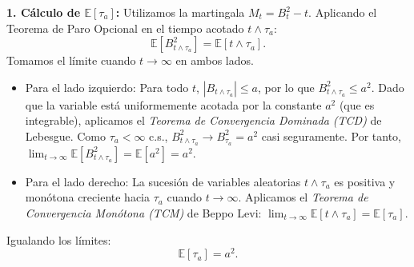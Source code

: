 \documentclass[11pt, letterpaper]{article}
\begin{document}
\begin{solucion}
    \textbf{1. Cálculo de $\mathbb{E}[\tau_a]$:}
    Utilizamos la martingala $M_t = B_t^2 - t$. Aplicando el Teorema de Paro Opcional en el tiempo acotado $t \wedge \tau_a$:
    \[ \mathbb{E}[B_{t \wedge \tau_a}^2] = \mathbb{E}[t \wedge \tau_a]. \]
    Tomamos el límite cuando $t \to \infty$ en ambos lados.
    \begin{itemize}
        \item Para el lado izquierdo: Para todo $t$, $|B_{t \wedge \tau_a}| \le a$, por lo que $B_{t \wedge \tau_a}^2 \le a^2$. Dado que la variable está uniformemente acotada por la constante $a^2$ (que es integrable), aplicamos el \textit{Teorema de Convergencia Dominada (TCD)} de Lebesgue. Como $\tau_a < \infty$ c.s., $B_{t \wedge \tau_a}^2 \to B_{\tau_a}^2 = a^2$ casi seguramente. Por tanto, $\lim_{t \to \infty} \mathbb{E}[B_{t \wedge \tau_a}^2] = \mathbb{E}[a^2] = a^2$.
        \item Para el lado derecho: La sucesión de variables aleatorias $t \wedge \tau_a$ es positiva y monótona creciente hacia $\tau_a$ cuando $t \to \infty$. Aplicamos el \textit{Teorema de Convergencia Monótona (TCM)} de Beppo Levi: $\lim_{t \to \infty} \mathbb{E}[t \wedge \tau_a] = \mathbb{E}[\tau_a]$.
    \end{itemize}
    Igualando los límites:
    \[ \mathbb{E}[\tau_a] = a^2. \]


\end{solucion}
\end{document}
